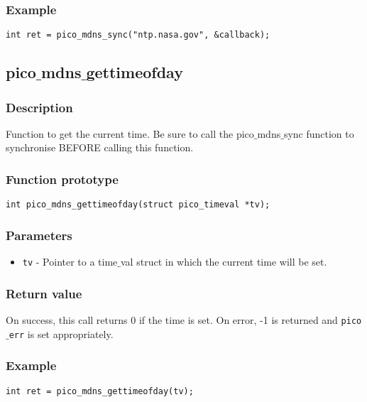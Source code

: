 \subsubsection*{Example}
\begin{verbatim}
int ret = pico_mdns_sync("ntp.nasa.gov", &callback);
\end{verbatim}



\subsection{pico$\_$mdns$\_$gettimeofday}

\subsubsection*{Description}
Function to get the current time. Be sure to call the pico$\_$mdns$\_$sync function to synchronise BEFORE calling this function.

\subsubsection*{Function prototype}
\begin{verbatim}
int pico_mdns_gettimeofday(struct pico_timeval *tv);
\end{verbatim}

\subsubsection*{Parameters}
\begin{itemize}[noitemsep]
\item \texttt{tv} - Pointer to a time$\_$val struct in which the current time will be set.
\end{itemize}

\subsubsection*{Return value}
On success, this call returns 0 if the time is set.
On error, -1 is returned and \texttt{pico$\_$err} is set appropriately.

\subsubsection*{Example}
\begin{verbatim}
int ret = pico_mdns_gettimeofday(tv);
\end{verbatim}



